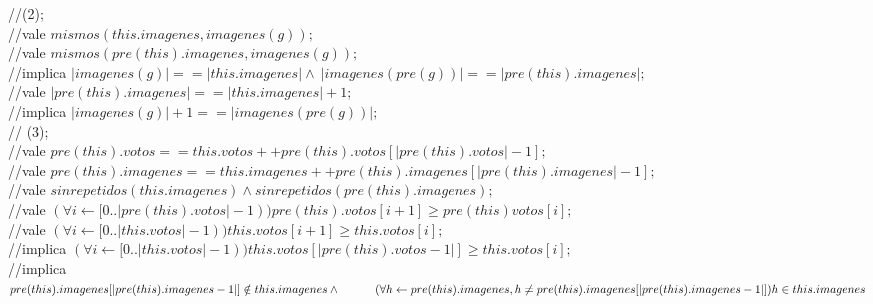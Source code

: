 \documentclass[10pt,a4paper,spanish]{article}
\begin{document}
{\indent //(2);\\
\indent //vale $mismos(this.imagenes, imagenes(g));$  \\
\indent //vale $mismos(pre(this).imagenes, imagenes(g));$  \\
\indent //implica $|imagenes(g)| == |this.imagenes| \land \ |imagenes(pre(g))| == |pre(this).imagenes|;$ \\
\indent //vale $|pre(this).imagenes| == |this.imagenes|+1;$ \\
\indent //implica $|imagenes(g)|+1 == |imagenes(pre(g))|;$ \\


\indent // (3);\\
\indent //vale $pre(this).votos ==  this.votos ++ pre(this).votos[|pre(this).votos|-1]; $ \\
\indent //vale $pre(this).imagenes ==  this.imagenes ++ pre(this).imagenes[|pre(this).imagenes|-1];$ \\
\indent //vale $sinrepetidos(this.imagenes) \land sinrepetidos(pre(this).imagenes);$ \\
\indent //vale $(\forall i \leftarrow [0..|pre(this).votos|-1)) pre(this).votos[i+1] \geq pre(this)votos[i] ;$ \\
\indent //vale $(\forall i \leftarrow [0..|this.votos|-1)) this.votos[i+1] \geq this.votos[i] ;$  \\
\indent //implica $(\forall i \leftarrow [0..|this.votos|-1)) this.votos[|pre(this).votos-1|] \geq this.votos[i];$ \\
\indent //implica $ pre(this).imagenes[|pre(this).imagenes-1|] \notin this.imagenes \land\\
  \indent\indent(\forall h \leftarrow pre(this).imagenes, h \neq pre(this).imagenes[|pre(this).imagenes-1|] ) h \in this.imagenes $ \\
}
\end{document}
